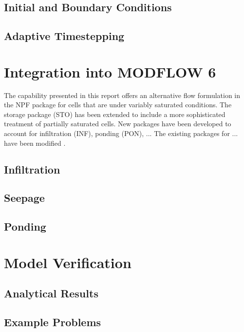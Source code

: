 \documentclass[fleqn]{article}
\begin{document}
\subsection{Initial and Boundary Conditions}
\subsection{Adaptive Timestepping}

\section{Integration into MODFLOW 6}
The capability presented in this report offers an alternative flow
formulation in the NPF package for cells that are under variably 
saturated conditions. The storage package (STO) has been extended
to include a more sophisticated treatment of partially saturated
cells. New packages have been developed to account for infiltration (INF),
ponding (PON), ... The existing packages for ... have been modified .

\subsection{Infiltration}
\subsection{Seepage}
\subsection{Ponding}

\section{Model Verification}
\subsection{Analytical Results}
\subsection{Example Problems}


 
\end{document}

